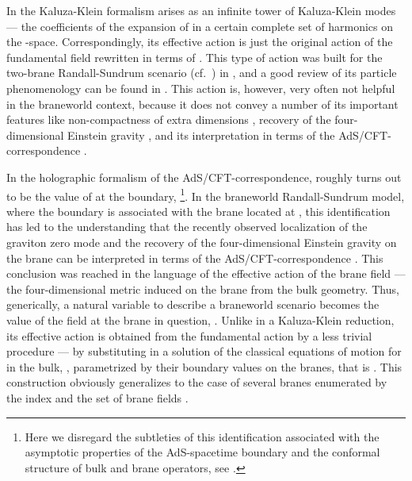 \documentclass[a4paper,preprint,nofootinbib,
                 showpacs,preprintnumbers,amsmath,amssymb]{revtex4}
\begin{document}
In the Kaluza-Klein formalism \coordHE{} arises as an  
infinite 
tower of Kaluza-Klein modes --- the coefficients of the expansion of 
\coordHE{} in a certain complete set of harmonics on the \coordHE{}-space. 
Correspondingly, its effective action is just the original action of the 
fundamental field \coordHE{} rewritten in terms of \coordHE{}. 
This type of action was built for the two-brane Randall-Sundrum scenario 
(cf.~\cite{RS}) in \cite{KubVol}, and a good review of its particle 
phenomenology can be found in \cite{Kub}.  This  action is, however,  
very often not 
helpful in the braneworld context, because it does not convey a 
number of its important features like non-compactness of extra 
dimensions \cite{RSloc,Rub}, recovery of the four-dimensional 
Einstein gravity \cite{GT}, and its interpretation in terms of the 
AdS/CFT-correspondence \cite{Gubser,GKR,HHR1}. 
 
In the holographic formalism of the AdS/CFT-correspondence, \coordHE{}  
roughly turns out to be the value of \coordHE{} at the boundary,  
\coordHE{}\footnote{Here we disregard the  
subtleties of this identification associated with the asymptotic  
properties of the AdS-spacetime boundary and the conformal structure  
of bulk and brane operators, see \cite{BalGiLa,BalKraLa}.}. In the  
braneworld Randall-Sundrum model, where 
the boundary is associated with the brane \myHighlight{$\Sigma$}\coordHE{} located at \coordHE{}, 
this identification has led to the understanding that the recently observed 
localization of the graviton zero mode \cite{RSloc} and the recovery of the 
four-dimensional Einstein gravity on the brane \cite{RSloc,GT,ChGR} can be 
interpreted in terms of the AdS/CFT-correspondence \cite{Gubser,GKR,HHR1}. 
This conclusion was reached in the language of the effective action of the 
brane field --- the four-dimensional metric induced on the brane from the bulk 
geometry. Thus, generically, a natural variable to describe a braneworld 
scenario becomes the value of the field at the brane in question, 
\coordHE{}. Unlike in a Kaluza-Klein reduction, its 
effective action \coordHE{} is obtained from the fundamental 
action \coordHE{} by a less trivial procedure --- by substituting in 
\coordHE{} a solution of the classical equations of motion for \coordHE{} 
in the bulk, \myHighlight{$\Phi=\Phi[\,\phi(x)\,]$}\coordHE{}, parametrized by their boundary values 
on the branes, that is \coordHE{}. This construction obviously generalizes to 
the case of several branes \coordHE{} enumerated by the index \coordHE{} and the set 
of brane fields \coordHE{}. 
 
\end{document}
